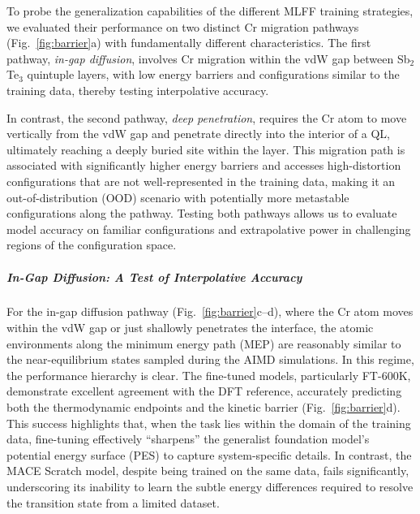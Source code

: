\documentclass[pdflatex,sn-mathphys-num]{sn-jnl}%
\theoremstyle{thmstyleone}%
\theoremstyle{thmstyletwo}%
\theoremstyle{thmstylethree}%
\begin{document}

To probe the generalization capabilities of the different MLFF training strategies, we evaluated their performance on two distinct Cr migration pathways (Fig.~\ref{fig:barrier}a) with fundamentally different characteristics. The first pathway, \emph{in-gap diffusion}, involves Cr migration within the vdW gap between Sb$_2$Te$_3$ quintuple layers, with low energy barriers and configurations similar to the training data, thereby testing interpolative accuracy.

In contrast, the second pathway, \emph{deep penetration}, requires the Cr atom to move vertically from the vdW gap and penetrate directly into the interior of a QL, ultimately reaching a deeply buried site within the layer. This migration path is associated with significantly higher energy barriers and accesses high-distortion configurations that are not well-represented in the training data, making it an out-of-distribution (OOD) scenario with potentially more metastable configurations along the pathway. Testing both pathways allows us to evaluate model accuracy on familiar configurations and extrapolative power in challenging regions of the configuration space.


\subparagraph{In-Gap Diffusion: A Test of Interpolative Accuracy}

For the in-gap diffusion pathway (Fig.~\ref{fig:barrier}c--d), where the Cr atom moves within the vdW gap or just shallowly penetrates the interface, the atomic environments along the minimum energy path (MEP) are reasonably similar to the near-equilibrium states sampled during the AIMD simulations. In this regime, the performance hierarchy is clear. The fine-tuned models, particularly FT-600K, demonstrate excellent agreement with the DFT reference, accurately predicting both the thermodynamic endpoints and the kinetic barrier (Fig.~\ref{fig:barrier}d). This success highlights that, when the task lies within the domain of the training data, fine-tuning effectively ``sharpens'' the generalist foundation model's potential energy surface (PES) to capture system-specific details. In contrast, the MACE Scratch model, despite being trained on the same data, fails significantly, underscoring its inability to learn the subtle energy differences required to resolve the transition state from a limited dataset.
\end{document}
